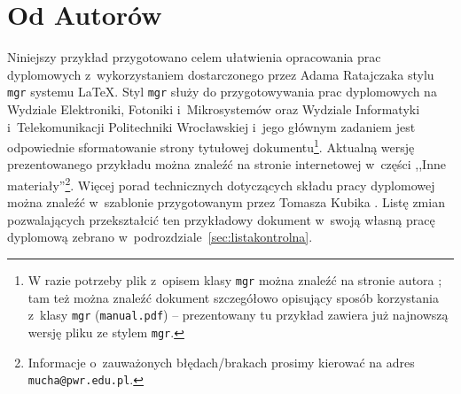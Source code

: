\chapter*{Od Autorów}

Niniejszy przykład przygotowano celem ułatwienia opracowania prac dyplomowych z~wykorzystaniem dostarczonego przez Adama Ratajczaka stylu \texttt{mgr} systemu \LaTeX{}. Styl \texttt{mgr} służy do przygotowywania prac dyplomowych na Wydziale Elektroniki, Fotoniki i~Mikrosystemów oraz Wydziale Informatyki i~Telekomunikacji Politechniki Wrocławskiej i~jego głównym zadaniem jest odpowiednie sformatowanie strony tytułowej dokumentu\footnote{W razie potrzeby plik z~opisem klasy \texttt{mgr} można znaleźć na stronie autora \cite{Ratajczak}; tam też można znaleźć dokument szczegółowo opisujący sposób korzystania z~klasy \texttt{mgr} (\texttt{manual.pdf}) -- prezentowany tu przykład zawiera już najnowszą wersję pliku ze stylem \texttt{mgr}.}. Aktualną wersję prezentowanego przykładu można znaleźć na stronie internetowej \cite{wzor_praca} w~części ,,Inne materiały''\footnote{Informacje o~zauważonych błędach/brakach prosimy kierować na adres \texttt{mucha@pwr.edu.pl}.}. Więcej porad technicznych dotyczących składu pracy dyplomowej można znaleźć w~szablonie przygotowanym przez Tomasza Kubika \cite{kubik}. Listę zmian pozwalających przekształcić ten przykładowy dokument w~swoją własną pracę dyplomową zebrano w~podrozdziale~\ref{sec:listakontrolna}.


